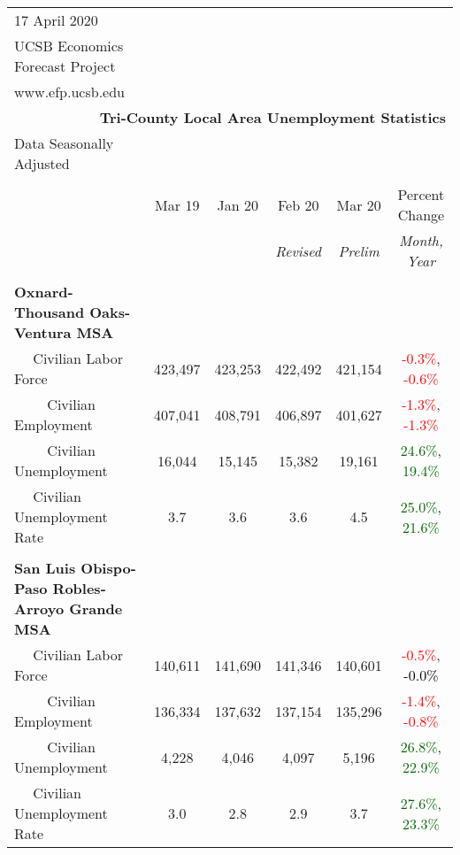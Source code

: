 \documentclass[12pt]{article}
\begin{document}
\begin{landscape}
\begin{table}
\begin{tabular}{|l|c|c|c|c|c|}
\multicolumn{1}{l}{\small 17 April 2020} & \multicolumn{5}{c}{} \\
\multicolumn{1}{l}{\small UCSB Economics Forecast Project} & \multicolumn{5}{c}{} \\
\multicolumn{1}{l}{\small www.efp.ucsb.edu} & \multicolumn{5}{c}{} \\
\multicolumn{6}{r}{\large \textbf{Tri-County Local Area Unemployment Statistics}} \\
\multicolumn{1}{l}{\small Data Seasonally Adjusted} & \multicolumn{5}{c}{} \\ \hline \hline
& & & & & \\
 & Mar 19 & Jan 20 & Feb 20 & Mar 20 & Percent Change \\
 & & & \small \textit{Revised} & \small \textit{Prelim} & \small \textit{Month, Year} \\ \hline
&&&&& \\
\textbf{Oxnard-Thousand Oaks-Ventura MSA} &&&&& \\
$\quad$ Civilian Labor Force &423,497 & 423,253 & 422,492 & 421,154 & \textcolor{red}{-0.3\%}, \textcolor{red}{-0.6\%} \\
$\qquad$ \small Civilian Employment &407,041 & 408,791 & 406,897 & 401,627 & \textcolor{red}{-1.3\%}, \textcolor{red}{-1.3\%} \\
$\qquad$ \small Civilian Unemployment &16,044 & 15,145 & 15,382 & 19,161 & \textcolor{darkgreen}{24.6\%}, \textcolor{darkgreen}{19.4\%} \\
$\quad$ Civilian Unemployment Rate &3.7 & 3.6 & 3.6 & 4.5 & \textcolor{darkgreen}{25.0\%}, \textcolor{darkgreen}{21.6\%} \\
&&&&& \\
\textbf{San Luis Obispo-Paso Robles-Arroyo Grande MSA} &&&&& \\
$\quad$ Civilian Labor Force &140,611 & 141,690 & 141,346 & 140,601 & \textcolor{red}{-0.5\%}, \textcolor{black}{-0.0\%} \\
$\qquad$ \small Civilian Employment &136,334 & 137,632 & 137,154 & 135,296 & \textcolor{red}{-1.4\%}, \textcolor{red}{-0.8\%} \\
$\qquad$ \small Civilian Unemployment &4,228 & 4,046 & 4,097 & 5,196 & \textcolor{darkgreen}{26.8\%}, \textcolor{darkgreen}{22.9\%} \\
$\quad$ Civilian Unemployment Rate &3.0 & 2.8 & 2.9 & 3.7 & \textcolor{darkgreen}{27.6\%}, \textcolor{darkgreen}{23.3\%} \\

\end{tabular}
\end{table}
\end{landscape}
\end{document}
